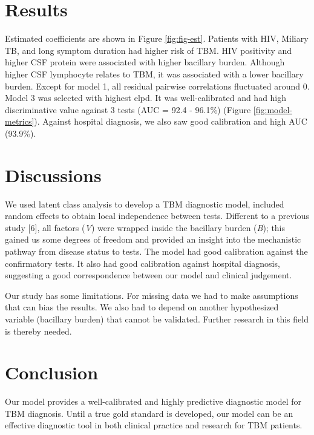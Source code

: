 \documentclass[
  12pt,
]{article}
\begin{document}
\hypertarget{results}{%
\section{Results}\label{results}}

Estimated coefficients are shown in Figure \ref{fig:fig-est}. Patients with HIV, Miliary TB, and long symptom duration had higher risk of TBM. HIV positivity and higher CSF protein were associated with higher bacillary burden. Although higher CSF lymphocyte relates to TBM, it was associated with a lower bacillary burden. Except for model 1, all residual pairwise correlations fluctuated around 0. Model 3 was selected with highest elpd. It was well-calibrated and had high discriminative value against 3 tests (AUC = 92.4 - 96.1\%) (Figure \ref{fig:model-metrics}). Against hospital diagnosis, we also saw good calibration and high AUC (93.9\%).

\hypertarget{discussions}{%
\section{Discussions}\label{discussions}}

We used latent class analysis to develop a TBM diagnostic model, included random effects to obtain local independence between tests. Different to a previous study {[}6{]}, all factors (\emph{V}) were wrapped inside the bacillary burden (\emph{B}); this gained us some degrees of freedom and provided an insight into the mechanistic pathway from disease status to tests. The model had good calibration against the confirmatory tests. It also had good calibration against hospital diagnosis, suggesting a good correspondence between our model and clinical judgement.

Our study has some limitations. For missing data we had to make assumptions that can bias the results. We also had to depend on another hypothesized variable (bacillary burden) that cannot be validated. Further research in this field is thereby needed.

\hypertarget{conclusion}{%
\section{Conclusion}\label{conclusion}}

Our model provides a well-calibrated and highly predictive diagnostic model for TBM diagnosis. Until a true gold standard is developed, our model can be an effective diagnostic tool in both clinical practice and research for TBM patients.
\end{document}
